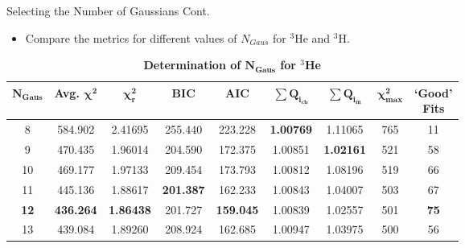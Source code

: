 \documentclass[10pt]{beamer}
\begin{document}
\begin{frame}[fragile]{Selecting the Number of Gaussians Cont.}

	\begin{itemize}
		\item Compare the metrics for \alert{different values of $N_{Gaus}$} for \alert{$^3$He} and \alert{$^3$H}.
	\end{itemize}
	
	\pause
	\vspace{-3mm}
	{\scriptsize{
	\begin{table}[!h]
	\centering
	\begin{tabular}{|c c c c c c c c c|}
	\hline
	$\boldsymbol{N_{Gaus}}$ & \textbf{Avg.} $\boldsymbol{\chi^2}$ & $\boldsymbol{\chi^2_r}$ & \textbf{BIC} & \textbf{AIC} & $\boldsymbol{\sum Q_{i_{ch}}}$ & $\boldsymbol{\sum Q_{i_{m}}}$ & $\boldsymbol{\chi^2_{max}}$ & 		\makecell{\textbf{`Good'}\\ 	\textbf{Fits}} \\
	\hline
	8 & 584.902 & 2.41695 & 255.440 & 223.228 & \alert{\textbf{1.00769}} & 1.11065 & 765 & 11 \\
	9 & 470.435 & 1.96014 & 204.590 & 172.375 & 1.00851 & \alert{\textbf{1.02161}} & 521 & 58 \\
	10 & 469.177 & 1.97133 & 209.454 & 173.793 & 1.00812 & 1.08196 & 519 & 66 \\
	11 & 445.136 & 1.88617 & \alert{\textbf{201.387}} & 162.233 & 1.00843 & 1.04007 & 503 & 67 \\
	\alert{\textbf{12}} & \alert{\textbf{436.264}} & \alert{\textbf{1.86438}} & 201.727 & \alert{\textbf{159.045}} & 1.00839 & 1.02557 & 501 & \alert{\textbf{75}} \\
	13 & 439.084 & 1.89260 & 208.924 & 162.685 & 1.00947 & 1.03975 & 500 & 56 \\
	\hline
	\end{tabular}
	\caption{\bf{Determination of $\boldsymbol{N_{Gaus}}$ for $^3$He}}
	\label{tab:3he_ngaus}
	\end{table}
	}}
	

\end{frame}
\end{document}
